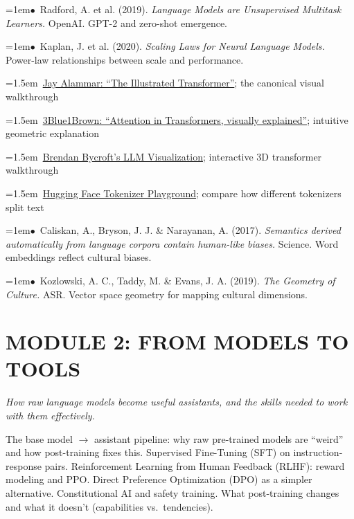 \documentclass[11pt, a4paper]{article}
\newcommand{\topichead}[1]{%
  \vspace{0.8em}{\large\sffamily\bfseries\textcolor{accent}{#1}}\par\vspace{0.3em}
}
\newcommand{\seclabel}[1]{%
  \vspace{0.5em}{\normalsize\sffamily\bfseries\textcolor{accent}{#1}}\par\vspace{0.2em}
}
\newcommand{\refpaper}[1]{%
  \par\hangindent=1em\hangafter=1\noindent\textcolor{accent}{\small$\bullet$}~{\small #1}\par
}
\newcommand{\resource}[1]{%
  \par\hangindent=1.5em\hangafter=1\noindent\hspace{0.5em}{\small\textcolor{accent}{\guilsinglright}}~{\small #1}\par
}
\begin{document}
\refpaper{Radford, A. et al. (2019). \textit{Language Models are Unsupervised Multitask Learners.} OpenAI. GPT-2 and zero-shot emergence.}

\refpaper{Kaplan, J. et al. (2020). \textit{Scaling Laws for Neural Language Models.} Power-law relationships between scale and performance.}

\seclabel{Further Resources}

\resource{\href{https://jalammar.github.io/illustrated-transformer/}{Jay Alammar: ``The Illustrated Transformer''}; the canonical visual walkthrough}

\resource{\href{https://www.youtube.com/watch?v=eMlx5fFNoYc}{3Blue1Brown: ``Attention in Transformers, visually explained''}; intuitive geometric explanation}

\resource{\href{https://bbycroft.net/llm}{Brendan Bycroft's LLM Visualization}; interactive 3D transformer walkthrough}

\resource{\href{https://huggingface.co/spaces/Xenova/the-tokenizer-playground}{Hugging Face Tokenizer Playground}; compare how different tokenizers split text}

\seclabel{Social Science Applications}

\refpaper{Caliskan, A., Bryson, J. J. \& Narayanan, A. (2017). \textit{Semantics derived automatically from language corpora contain human-like biases.} Science. Word embeddings reflect cultural biases.}

\refpaper{Kozlowski, A. C., Taddy, M. \& Evans, J. A. (2019). \textit{The Geometry of Culture.} ASR. Vector space geometry for mapping cultural dimensions.}


\section{MODULE 2: FROM MODELS TO TOOLS}
{\textit{\textcolor{muted}{How raw language models become useful assistants, and the skills needed to work with them effectively.}}}

\vspace{1em}

\topichead{Post-Training: Making Models Useful}

\seclabel{Core Concepts}

The base model $\rightarrow$ assistant pipeline: why raw pre-trained models are ``weird'' and how post-training fixes this. Supervised Fine-Tuning (SFT) on instruction-response pairs. Reinforcement Learning from Human Feedback (RLHF): reward modeling and PPO. Direct Preference Optimization (DPO) as a simpler alternative. Constitutional AI and safety training. What post-training changes and what it doesn't (capabilities vs.\ tendencies).
\end{document}
